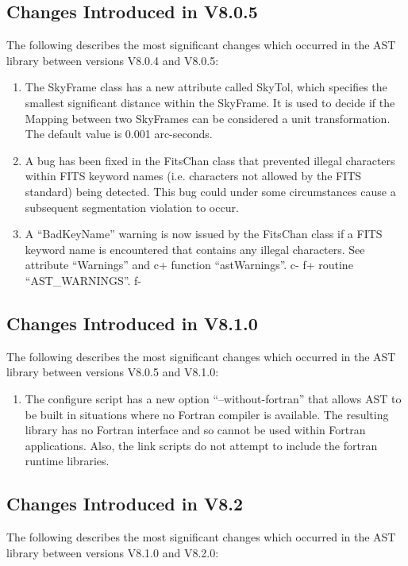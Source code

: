 \documentclass[twoside,11pt]{starlink}
\begin{document}
\subsection{Changes Introduced in V8.0.5}
The following describes the most significant changes which
occurred in the AST library between versions V8.0.4 and V8.0.5:

\begin{enumerate}

\item The SkyFrame class has a new attribute called SkyTol, which specifies
the smallest significant distance within the SkyFrame. It is used to
decide if the Mapping between two SkyFrames can be considered a unit
transformation. The default value is 0.001 arc-seconds.

\item A bug has been fixed in the FitsChan class that prevented illegal
characters within FITS keyword names (i.e. characters not allowed by the
FITS standard) being detected. This bug could under some circumstances
cause a subsequent segmentation violation to occur.

\item A ``BadKeyName'' warning is now issued by the FitsChan class if a FITS
keyword name is encountered that contains any illegal characters. See
attribute ``Warnings'' and
c+
function ``astWarnings''.
c-
f+
routine ``AST\_WARNINGS''.
f-

\end{enumerate}

\subsection{Changes Introduced in V8.1.0}
The following describes the most significant changes which
occurred in the AST library between versions V8.0.5 and V8.1.0:

\begin{enumerate}

\item The configure script has a new option ``--without-fortran'' that allows
AST to be built in situations where no Fortran compiler is available. The
resulting library has no Fortran interface and so cannot be used within
Fortran applications. Also, the link scripts do not attempt to include the
fortran runtime libraries.

\end{enumerate}

\subsection{Changes Introduced in V8.2}
The following describes the most significant changes which
occurred in the AST library between versions V8.1.0 and V8.2.0:
\end{document}
